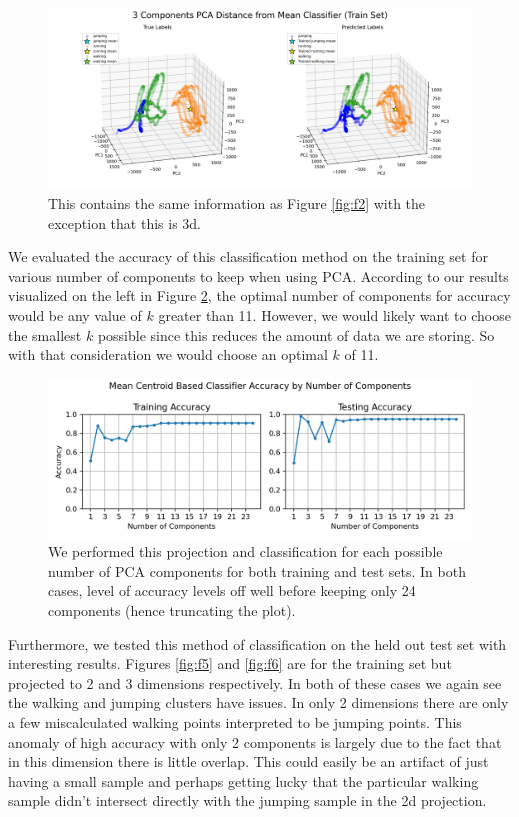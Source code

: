 \documentclass[11pt]{amsart}
\begin{document}
\begin{figure}[h]
	\centering
	\includegraphics[width=.75\textwidth]{../visualizations/pca_distance_from_mean_classifier_3d.png}
 	\caption{This contains the same information as Figure \ref{fig:f2} with the exception that this is 3d.}\label{fig:f3}
\end{figure}

We evaluated the accuracy of this classification method on the training set for various number of components to keep when using PCA.
According to our results visualized on the left in Figure \ref{fig:f4}, the optimal number of components for accuracy would be any value of $k$ greater than 11.
However, we would likely want to choose the smallest $k$ possible since this reduces the amount of data we are storing.
So with that consideration we would choose an optimal $k$ of 11.

\begin{figure}[h]
	\centering
	\includegraphics[width=.75\textwidth]{../visualizations/train_and_test_accuracy_by_num_components.png}
 	\caption{We performed this projection and classification for each possible number of PCA components for both training and test sets.
	In both cases, level of accuracy levels off well before keeping only 24 components (hence truncating the plot).}\label{fig:f4}
\end{figure}

Furthermore, we tested this method of classification on the held out test set with interesting results.
Figures \ref{fig:f5} and \ref{fig:f6} are for the training set but projected to 2 and 3 dimensions respectively.
In both of these cases we again see the walking and jumping clusters have issues.
In only 2 dimensions there are only a few miscalculated walking points interpreted to be jumping points.
This anomaly of high accuracy with only 2 components is largely due to the fact that in this dimension there is little overlap.
This could easily be an artifact of just having a small sample and perhaps getting lucky that the particular walking sample didn't intersect directly with the jumping sample in the 2d projection.
\end{document}
